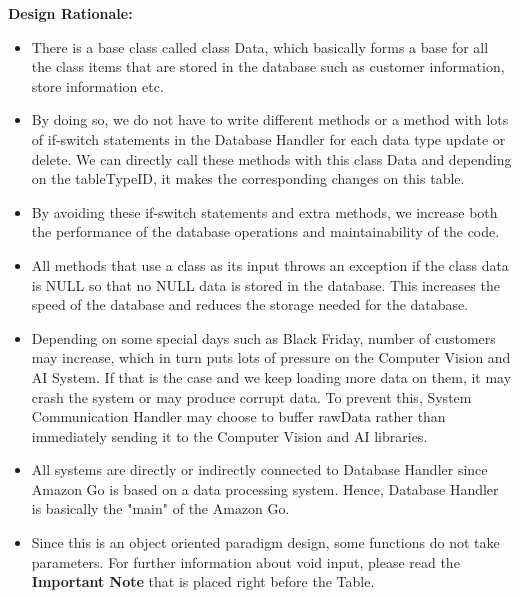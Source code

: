 \documentclass[11pt]{article}
\begin{document}
    \textbf{Design Rationale:\\}
    \begin{itemize}
        
        \item There is a base class called class Data, which basically forms a base for all the class items that are stored in the database such as customer information, store information etc.
        
        \item By doing so, we do not have to write different methods or a method with lots of if-switch statements in the Database Handler for each data type update or delete. We can directly call these methods with this class Data and depending on the tableTypeID, it makes the corresponding changes on this table.
       
        \item By avoiding these if-switch statements and extra methods, we increase both the performance of the database operations and maintainability of the code.
        
        \item All methods that use a class as its input throws an exception if the class data is NULL so that no NULL data is stored in the database. This increases the speed of the database and reduces the storage needed for the database. 
        
        \item Depending on some special days such as Black Friday, number of customers may increase, which in turn puts lots of pressure on the Computer Vision and AI System. 
        If that is the case and we keep loading more data on them, it may crash the system or may produce corrupt data. To prevent this, System Communication Handler may choose to buffer rawData rather than immediately sending it to the Computer Vision and AI libraries.
        \item All systems are directly or indirectly connected to Database Handler since Amazon Go is based on a data processing system. Hence, Database Handler is basically the "main" of the Amazon Go.
        
        \item Since this is an object oriented paradigm design, some functions do not take parameters. For further information about void input, please read the \textbf{Important Note} that is placed right before the  Table.
    \end{itemize}
    
\end{document}
